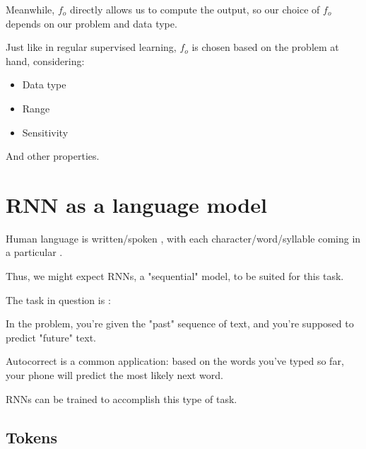        Meanwhile, $f_o$ directly allows us to compute the output, so our choice of $f_o$ depends on our problem and data type.\\

        \begin{concept}
            Just like in regular supervised learning, $f_o$ is chosen based on the problem at hand, considering:

            \begin{itemize}
                \item Data type
                \item Range
                \item Sensitivity
            \end{itemize}

            And other properties.
        \end{concept}




\pagebreak

\section{RNN as a language model}

    Human language is written/spoken , with each character/word/syllable coming in a particular .

    Thus, we might expect RNNs, a "sequential" model, to be suited for this task.

    The task in question is :\\

    \begin{definition}
        In the  problem, you're given the "past" sequence of text, and you're supposed to predict "future" text.
    \end{definition}

    \miniex Autocorrect is a common application: based on the words you've typed so far, your phone will predict the most likely next word.

    RNNs can be trained to accomplish this type of task.



    \phantom{}

    \subsection{Tokens}

